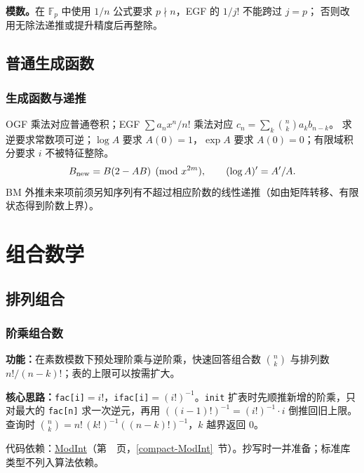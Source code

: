 \textbf{模数。}在 $\mathbb F_p$ 中使用 $1/n$ 公式要求 $p\nmid n$，EGF 的 $1/j!$ 不能跨过 $j=p$；
否则改用无除法递推或提升精度后再整除。


\Needspace{180pt}

\section{普通生成函数}

\subsection{生成函数与递推}\label{knowledge-generating-recurrence}
OGF 乘法对应普通卷积；EGF $\sum a_nx^n/n!$ 乘法对应 $c_n=\sum_k\binom nk a_kb_{n-k}$。
求逆要求常数项可逆；$\log A$ 要求 $A(0)=1$，$\exp A$ 要求 $A(0)=0$；有限域积分要求 $i$ 不被特征整除。
\[
B_{\rm new}=B(2-AB)\pmod{x^{2m}},\qquad
(\log A)'=A'/A.
\]
BM 外推未来项前须另知序列有不超过相应阶数的线性递推（如由矩阵转移、有限状态得到阶数上界）。



\Needspace{626pt}

\chapter{组合数学}

\section{排列组合}

\subsection{阶乘组合数}\label{compact-Binomial}

\noindent\textbf{功能：}\allowbreak 在素数模数下预处理阶乘与逆阶乘，快速回答组合数 $\binom nk$ 与排列数 $n!/(n-k)!$；表的上限可以按需扩大。

\textbf{核心思路：}\allowbreak \texttt{fac[i]}$=i!$，\texttt{ifac[i]}$=(i!)^{-1}$。\texttt{init} 扩表时先顺推新增的阶乘，只对最大的 \texttt{fac[n]} 求一次逆元，再用 $((i-1)!)^{-1}=(i!)^{-1}\cdot i$ 倒推回旧上限。查询时 $\binom nk=n!\,(k!)^{-1}((n-k)!)^{-1}$，$k$ 越界返回 0。

代码依赖：\hyperref[compact-ModInt]{ModInt}（第~\pageref{compact-ModInt}~页，\ref{compact-ModInt}~节）。抄写时一并准备；标准库类型不列入算法依赖。

